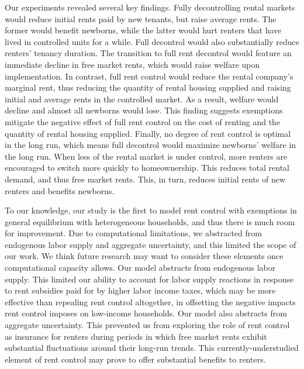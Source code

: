 \documentclass[parskip=full]{article}
\begin{document}
Our experiments revealed several key findings. Fully decontrolling rental markets would reduce initial rents paid by new tenants, but raise average rents. The former would benefit newborns, while the latter would hurt renters that have lived in controlled units for a while. Full decontrol would also substantially reduce renters' tenancy duration. The transition to full rent decontrol would feature an immediate decline in free market rents, which would raise welfare upon implementation. In contrast, full rent control would reduce the rental company's marginal rent, thus reducing the quantity of rental housing supplied and raising initial and average rents in the controlled market. As a result, welfare would decline and almost all newborns would lose. This finding suggests exemptions mitigate the negative effect of full rent control on the cost of renting and the quantity of rental housing supplied. Finally, no degree of rent control is optimal in the long run, which means full decontrol would maximize newborns' welfare in the long run. When less of the rental market is under control, more renters are encouraged to switch more quickly to homeownership. This reduces total rental demand, and thus free market rents. This, in turn, reduces initial rents of new renters and benefits newborns.

To our knowledge, our study is the first to model rent control with exemptions in general equilibrium with heterogeneous households, and thus there is much room for improvement. Due to computational limitations, we abstracted from endogenous labor supply and aggregate uncertainty, and this limited the scope of our work. We think future research may want to consider these elements once computational capacity allows. Our model abstracts from endogenous labor supply. This limited our ability to account for labor supply reactions in response to rent subsidies paid for by higher labor income taxes, which may be more effective than repealing rent control altogether, in offsetting the negative impacts rent control imposes on low-income households. Our model also abstracts from aggregate uncertainty. This prevented us from exploring the role of rent control as insurance for renters during periods in which free market rents exhibit substantial fluctuations around their long-run trends. This currently-understudied element of rent control may prove to offer substantial benefits to renters.



  
\end{document}
